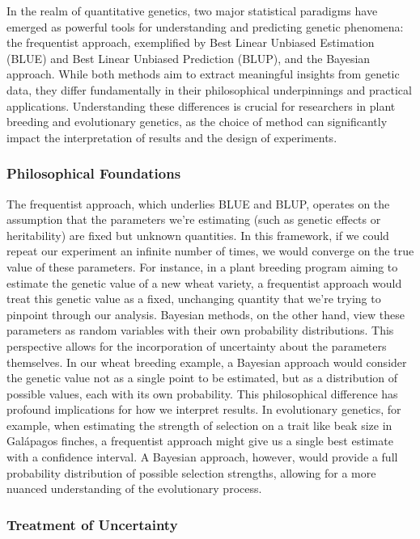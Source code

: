 \documentclass[12pt,a4paper]{article}
\begin{document}
In the realm of quantitative genetics, two major statistical paradigms have emerged as powerful tools for understanding and predicting genetic phenomena: the frequentist approach, exemplified by Best Linear Unbiased Estimation (BLUE) and Best Linear Unbiased Prediction (BLUP), and the Bayesian approach. While both methods aim to extract meaningful insights from genetic data, they differ fundamentally in their philosophical underpinnings and practical applications. Understanding these differences is crucial for researchers in plant breeding and evolutionary genetics, as the choice of method can significantly impact the interpretation of results and the design of experiments.

\subsubsection{Philosophical Foundations}

The frequentist approach, which underlies BLUE and BLUP, operates on the assumption that the parameters we're estimating (such as genetic effects or heritability) are fixed but unknown quantities. In this framework, if we could repeat our experiment an infinite number of times, we would converge on the true value of these parameters. For instance, in a plant breeding program aiming to estimate the genetic value of a new wheat variety, a frequentist approach would treat this genetic value as a fixed, unchanging quantity that we're trying to pinpoint through our analysis. Bayesian methods, on the other hand, view these parameters as random variables with their own probability distributions. This perspective allows for the incorporation of uncertainty about the parameters themselves. In our wheat breeding example, a Bayesian approach would consider the genetic value not as a single point to be estimated, but as a distribution of possible values, each with its own probability. This philosophical difference has profound implications for how we interpret results. In evolutionary genetics, for example, when estimating the strength of selection on a trait like beak size in Galápagos finches, a frequentist approach might give us a single best estimate with a confidence interval. A Bayesian approach, however, would provide a full probability distribution of possible selection strengths, allowing for a more nuanced understanding of the evolutionary process.

\subsubsection{Treatment of Uncertainty}
\end{document}

